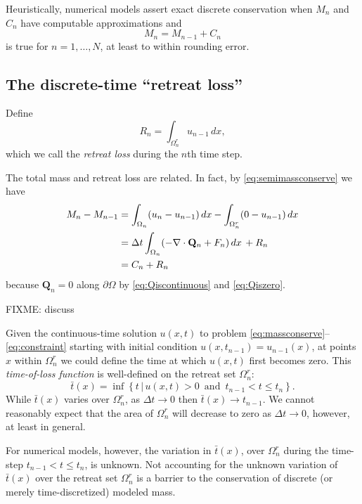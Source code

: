 \documentclass[final,leqno,onefignum,onetabnum]{siamltex1213bueler}
\newcommand\bQ{\mathbf{Q}}
\newcommand{\Div}{\nabla\cdot}
\begin{document}
Heuristically, numerical models assert exact discrete conservation when $M_n$ and $C_n$ have computable approximations and
	$$M_n = M_{n-1} + C_n$$
is true for $n=1,\dots,N$, at least to within rounding error.

\subsection{The discrete-time ``retreat loss''}  \label{subsec:retreatloss}  Define
\begin{equation}
R_n = \int_{\Omega_n^r} u_{n-1}\,dx, \label{eq:retreatlossseries}
\end{equation}
which we call the \emph{retreat loss} during the $n$th time step.

The total mass and retreat loss are related.  In fact, by \eqref{eq:semimassconserve} we have
\begin{align}
M_n - M_{n-1} &= \int_{\Omega_n} (u_n - u_{n-1})\,dx - \int_{\Omega_n^r} (0 - u_{n-1})\,dx \label{eq:massstep} \\
   &= \Delta t \int_{\Omega_n} (- \Div \bQ_n + F_n) \,dx \, + R_n \notag \\
   &= C_n + R_n \notag
\end{align}
because $\bQ_n=0$ along $\partial \Omega$ by \eqref{eq:Qiscontinuous} and \eqref{eq:Qiszero}.

FIXME: discuss

Given the continuous-time solution $u(x,t)$ to problem \eqref{eq:massconserve}--\eqref{eq:constraint} starting with initial condition $u(x,t_{n-1}) = u_{n-1}(x)$, at points $x$ within $\Omega_n^r$ we could define the time at which $u(x,t)$ first becomes zero.  This \emph{time-of-loss function} is well-defined on the retreat set $\Omega_n^r$:
\begin{equation}
\bar t(x) = \inf\left\{t \,\big|\, u(x,t)>0 \,\text{ and }\, t_{n-1} < t \le t_n\right\}.
\end{equation}
While $\bar t(x)$ varies over $\Omega_n^r$, as $\Delta t \to 0$ then $\bar t(x) \to t_{n-1}$.  We cannot reasonably expect that the area of $\Omega_n^r$ will decrease to zero as $\Delta t \to 0$, however, at least in general.

For numerical models, however, the variation in $\bar t(x)$, over $\Omega_n^r$ during the time-step $t_{n-1} < t \le t_n$, is unknown.  Not accounting for the unknown variation of $\bar t(x)$ over the retreat set $\Omega_n^r$ is a barrier to the conservation of discrete (or merely time-discretized) modeled mass.
\end{document}
